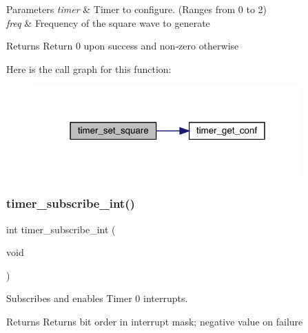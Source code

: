 \begin{DoxyParams}{Parameters}
{\em timer} & Timer to configure. (Ranges from 0 to 2) \\
\hline
{\em freq} & Frequency of the square wave to generate \\
\hline
\end{DoxyParams}
\begin{DoxyReturn}{Returns}
Return 0 upon success and non-\/zero otherwise 
\end{DoxyReturn}
Here is the call graph for this function\+:\nopagebreak
\begin{figure}[H]
\begin{center}
\leavevmode
\includegraphics[width=291pt]{group__timer_gada4efbb5c88275795526fc45f0814aa3_cgraph}
\end{center}
\end{figure}
\hypertarget{group__timer_ga4c5d9f47323eda494cfd826f6d62eec9}{}\label{group__timer_ga4c5d9f47323eda494cfd826f6d62eec9} 
\subsubsection{\texorpdfstring{timer\+\_\+subscribe\+\_\+int()}{timer\_subscribe\_int()}}
{\footnotesize\ttfamily int timer\+\_\+subscribe\+\_\+int (\begin{DoxyParamCaption}\item[{void}]{ }\end{DoxyParamCaption})}



Subscribes and enables Timer 0 interrupts. 

\begin{DoxyReturn}{Returns}
Returns bit order in interrupt mask; negative value on failure 
\end{DoxyReturn}
\hypertarget{group__timer_ga363e72d1c055d859746cb3305a68af6d}{}\label{group__timer_ga363e72d1c055d859746cb3305a68af6d} 
